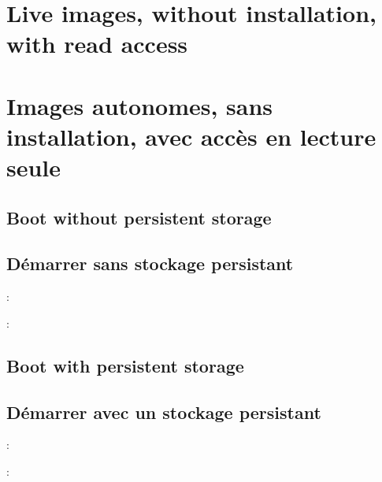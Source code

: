 \ml
{\section{Live images, without installation, with read access}}
{\section{Images autonomes, sans installation, avec accès en lecture seule}}

\ml
{\subsection{Boot without persistent storage}}
{\subsection{Démarrer sans stockage persistant}}

:
\begin{itmz}
\item{\ml{\todo}
{\todo}}
\end{itmz}

:
\begin{itmz}
\item{\ml{\todo}
{\todo}}
\end{itmz}

\ml
{\subsection{Boot with persistent storage}}
{\subsection{Démarrer avec un stockage persistant}}

:
\begin{itmz}
\item{\ml{\todo}
{\todo}}
\end{itmz}

:
\begin{itmz}
\item{\ml{\todo}
{\todo}}
\end{itmz}
